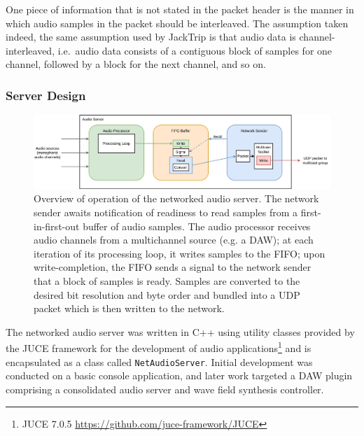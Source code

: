 \documentclass[utf8]{FrontiersinHarvard}
\begin{document}
    One piece of information that is not stated in the packet header is the manner
    in which audio samples in the packet should be interleaved.
    The assumption taken \textemdash{} indeed, the same assumption used by JackTrip
    \textemdash{} is that audio data is channel-interleaved, i.e.\ audio data
    consists of a contiguous block of samples for one channel, followed by a block
    for the next channel, and so on.

    \subsubsection{Server Design}

    \begin{figure}[ht]
        \centering
        \includegraphics[width=\textwidth]{figures/audio-server}
        \caption{Overview of operation of the networked audio server.
        The network sender awaits notification of readiness to read samples from a
        first-in-first-out buffer of audio samples.
        The audio processor receives audio channels from a multichannel source
            (e.g. a DAW); at each iteration of its processing loop, it writes
            samples to the FIFO; upon write-completion, the FIFO sends a signal to
            the network sender that a block of samples is ready.
            Samples are converted to the desired bit resolution and byte order and
            bundled into a UDP packet which is then written to the network.}
        \label{fig:audio-server}
    \end{figure}

    The networked audio server was written in C++ using utility classes provided
    by the JUCE framework for the development of audio applications\footnote{
        JUCE 7.0.5 \url{https://github.com/juce-framework/JUCE}
    }
    and is encapsulated as a class called \texttt{NetAudioServer}.
    Initial development was conducted on a basic console application, and later
    work targeted a DAW plugin comprising a consolidated audio server and wave
    field synthesis controller.
\end{document}
